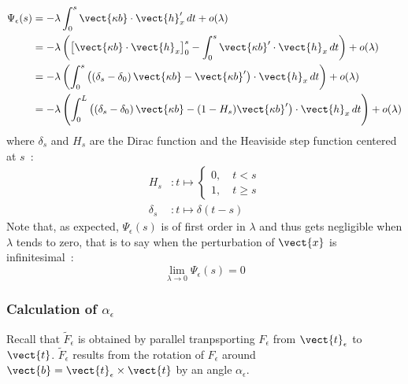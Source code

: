 \begin{equation}
	\begin{aligned}
		\Psi_\epsilon(s)
		&= - \lambda \int_0^s \vect{\kappa b}\cdot\vect{h}'_x \,dt + o(\lambda)\\
		&=  - \lambda \left(\big[\vect{\kappa b} \cdot  \vect{h}_x \big]_0^s - \int_0^s \vect{\kappa b}' \cdot  \vect{h}_x \,dt\right) + o(\lambda)\\
		&= - \lambda \left(\int_0^s \left(\left(\delta_s-\delta_0\right)\vect{\kappa b} - \vect{\kappa b}'\right)\cdot  \vect{h}_x \,dt\right) + o(\lambda)\\
		&= - \lambda \left(\int_0^L \left(\left(\delta_s-\delta_0\right)\vect{\kappa b} - (1-H_s)\vect{\kappa b}'\right)\cdot  \vect{h}_x \,dt\right) + o(\lambda)
	\end{aligned}
\label{eq:psi}
\end{equation}
where $\delta_s$ and $H_s$ are the Dirac function and the Heaviside step function centered at $s$~:
\begin{subequations}
	\begin{alignat}{1}
		H_s &: t \mapsto \left\{\begin{array}{c}0  , \quad t<s \\1  , \quad t\geqslant s \end{array}\right.
		\\[1em]
		\delta_s &: t \mapsto \delta(t-s)
	\end{alignat}
\end{subequations}
Note that, as expected, $\Psi_\epsilon(s)$ is of first order in $\lambda$ and thus gets negligible when $\lambda$ tends to zero, that is to say when the perturbation of $\vect{x}$ is infinitesimal~:
\begin{equation}
	\lim_{\lambda \to 0} \Psi_\epsilon(s) = 0
	\label{eq:lim_psi}
\end{equation}



\subsubsection{Calculation of $\alpha_\epsilon$}

Recall that $\tilde{F}_\epsilon$ is obtained by parallel tranpsporting $F_\epsilon$ from $\vect{t}_\epsilon$ to $\vect{t}$.
$\tilde{F}_\epsilon$ results from the rotation of $F_\epsilon$ around $\vect{b} = \vect{t}_\epsilon \times \vect{t}$ by an angle $\alpha_\epsilon$.

